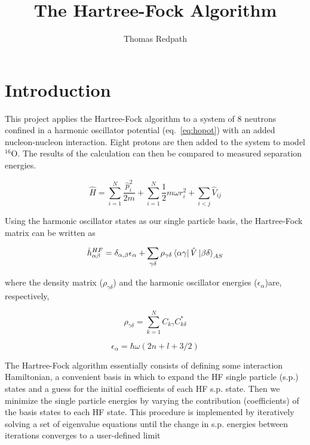 \documentclass[]{scrartcl}
\title{The Hartree-Fock Algorithm}
\author{Thomas Redpath}
\newcommand{\oxygen}[1]{%
	\ensuremath{ ^{#1} \mathrm{O} }}
\begin{document}

\maketitle

\section*{Introduction}

This project applies the Hartree-Fock algorithm to a system of 8 neutrons confined in a harmonic oscillator potential (eq.~\ref{eq:hopot}) with an added nucleon-nucleon interaction. Eight protons are then added to the system to model \oxygen{16}. The results of the calculation can then be compared to measured separation energies.

\begin{equation}
	\hat{H} = \sum_{i=1}^{N} \frac{\hat{p} _i ^2}{2m} + \sum_{i=1}^{N} \frac{1}{2} m \omega r _i ^2 + \sum_{i<j} \hat{V} _{ij}
	\label{eq:hopot}
\end{equation}

\noindent Using the harmonic oscillator states as our single particle basis, the Hartree-Fock matrix can be written as

\begin{equation}
	\hat{h} ^{HF} _{\alpha \beta} = \delta _{\alpha, \beta} \epsilon _{\alpha} + \sum_{\gamma \delta} \rho _{\gamma \delta} \bra{\alpha \gamma} \hat{V} \ket{ \beta \delta} _{AS}
	\label{eq:hfmtx}
\end{equation}

\noindent where the density matrix ($\rho _{\gamma \delta}$) and the harmonic oscillator energies ($\epsilon _{\alpha}$)are, respectively,

\begin{equation}
	\rho _{\gamma \delta} = \sum_{k=1}^{N} C _{k \gamma} C^{*} _{k \delta}
	\label{eq:hfrho}
\end{equation}

\begin{equation}
	\epsilon _{\alpha} = \hbar \omega ( 2n + l + 3/2)
	\label{eq:hospe}
\end{equation}

\noindent The Hartree-Fock algorithm essentially consists of defining some interaction Hamiltonian, a convenient basis in which to expand the HF single particle (s.p.) states and a guess for the initial coefficients of each HF s.p. state. Then we minimize the single particle energies by varying the contribution (coefficients) of the basis states to each HF state. This procedure is implemented by iteratively solving a set of eigenvalue equations until the change in s.p. energies between iterations converges to a user-defined limit
\end{document}

